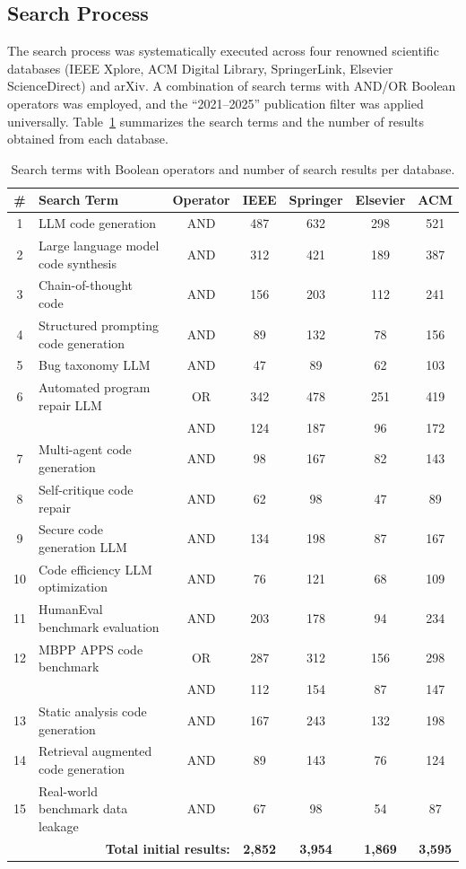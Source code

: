 \documentclass[11pt,a4paper]{article}
\begin{document}
\subsection{Search Process}
\label{sec:search_process}

The search process was systematically executed across four renowned scientific databases (IEEE Xplore, ACM Digital Library, SpringerLink, Elsevier ScienceDirect) and arXiv. A combination of search terms with AND/OR Boolean operators was employed, and the ``2021--2025'' publication filter was applied universally. Table~\ref{tab:search_terms} summarizes the search terms and the number of results obtained from each database.

\begin{table}[H]
\centering
\caption{Search terms with Boolean operators and number of search results per database.}
\label{tab:search_terms}
\small
\begin{tabular}{@{}clccccc@{}}
\toprule
\textbf{\#} & \textbf{Search Term} & \textbf{Operator} & \textbf{IEEE} & \textbf{Springer} & \textbf{Elsevier} & \textbf{ACM} \\
\midrule
1 & LLM code generation & AND & 487 & 632 & 298 & 521 \\
2 & Large language model code synthesis & AND & 312 & 421 & 189 & 387 \\
3 & Chain-of-thought code & AND & 156 & 203 & 112 & 241 \\
4 & Structured prompting code generation & AND & 89 & 132 & 78 & 156 \\
5 & Bug taxonomy LLM & AND & 47 & 89 & 62 & 103 \\
6 & Automated program repair LLM & OR & 342 & 478 & 251 & 419 \\
 & & AND & 124 & 187 & 96 & 172 \\
7 & Multi-agent code generation & AND & 98 & 167 & 82 & 143 \\
8 & Self-critique code repair & AND & 62 & 98 & 47 & 89 \\
9 & Secure code generation LLM & AND & 134 & 198 & 87 & 167 \\
10 & Code efficiency LLM optimization & AND & 76 & 121 & 68 & 109 \\
11 & HumanEval benchmark evaluation & AND & 203 & 178 & 94 & 234 \\
12 & MBPP APPS code benchmark & OR & 287 & 312 & 156 & 298 \\
 & & AND & 112 & 154 & 87 & 147 \\
13 & Static analysis code generation & AND & 167 & 243 & 132 & 198 \\
14 & Retrieval augmented code generation & AND & 89 & 143 & 76 & 124 \\
15 & Real-world benchmark data leakage & AND & 67 & 98 & 54 & 87 \\
\midrule
\multicolumn{3}{r}{\textbf{Total initial results:}} & \textbf{2{,}852} & \textbf{3{,}954} & \textbf{1{,}869} & \textbf{3{,}595} \\
\bottomrule
\end{tabular}
\end{table}
\end{document}

